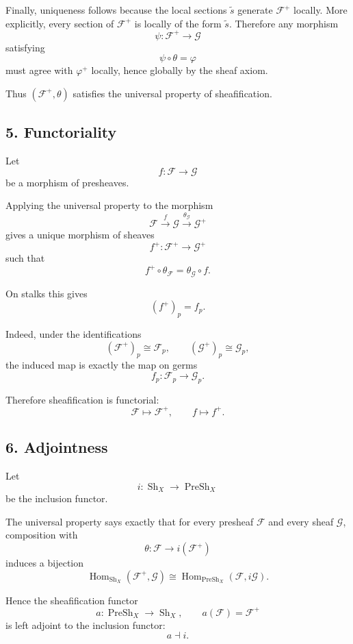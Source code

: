 \documentclass[12pt,a4paper]{article}
\begin{document}
Finally, uniqueness follows because the local sections $\widetilde{s}$ generate
$\mathcal F^+$ locally. More explicitly, every section of $\mathcal F^+$ is
locally of the form $\widetilde{s}$. Therefore any morphism
\[
\psi : \mathcal F^+ \to \mathcal G
\]
satisfying
\[
\psi \circ \theta = \varphi
\]
must agree with $\varphi^+$ locally, hence globally by the sheaf axiom.

Thus $(\mathcal F^+,\theta)$ satisfies the universal property of
sheafification.

\subsection*{5. Functoriality}

Let
\[
f : \mathcal F \longrightarrow \mathcal G
\]
be a morphism of presheaves.

Applying the universal property to the morphism
\[
\mathcal F \xrightarrow{f} \mathcal G
\xrightarrow{\theta_{\mathcal G}} \mathcal G^+
\]
gives a unique morphism of sheaves
\[
f^+ : \mathcal F^+ \longrightarrow \mathcal G^+
\]
such that
\[
f^+ \circ \theta_{\mathcal F}
=
\theta_{\mathcal G} \circ f.
\]

On stalks this gives
\[
(f^+)_p = f_p.
\]

Indeed, under the identifications
\[
(\mathcal F^+)_p \cong \mathcal F_p,
\qquad
(\mathcal G^+)_p \cong \mathcal G_p,
\]
the induced map is exactly the map on germs
\[
f_p : \mathcal F_p \longrightarrow \mathcal G_p.
\]

Therefore sheafification is functorial:
\[
\mathcal F \longmapsto \mathcal F^+,
\qquad
f \longmapsto f^+.
\]

\subsection*{6. Adjointness}

Let
\[
i : \operatorname{Sh}_X \longrightarrow \operatorname{PreSh}_X
\]
be the inclusion functor.

The universal property says exactly that for every presheaf $\mathcal F$ and
every sheaf $\mathcal G$, composition with
\[
\theta : \mathcal F \to i(\mathcal F^+)
\]
induces a bijection
\[
\operatorname{Hom}_{\operatorname{Sh}_X}(\mathcal F^+,\mathcal G)
\cong
\operatorname{Hom}_{\operatorname{PreSh}_X}(\mathcal F,i\mathcal G).
\]

Hence the sheafification functor
\[
a : \operatorname{PreSh}_X \longrightarrow \operatorname{Sh}_X,
\qquad
a(\mathcal F)=\mathcal F^+
\]
is left adjoint to the inclusion functor:
\[
a \dashv i.
\]
\end{document}
